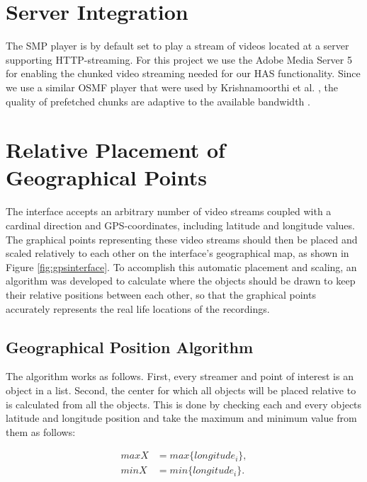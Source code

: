 \section{Server Integration}
\label{sec:serverintegration}

The SMP player is by default set to play a stream of videos located at a server supporting HTTP-streaming. For this project we use the Adobe Media Server 5 for enabling the chunked video streaming needed for our HAS functionality. Since we use a similar OSMF player that were used by Krishnamoorthi et al. \cite{hasmultipath}, the quality of prefetched chunks are adaptive to the available bandwidth \cite{hasmultipath}.

\section{Relative Placement of Geographical Points}
\label{sec:relativeplacement}

The interface accepts an arbitrary number of video streams coupled with a cardinal direction and GPS-coordinates, including latitude and longitude values. The graphical points representing these video streams should then be placed and scaled relatively to each other on the interface's geographical map, as shown in Figure \ref{fig:gpsinterface}. To accomplish this automatic placement and scaling, an algorithm was developed to calculate where the objects should be drawn to keep their relative positions between each other, so that the graphical points accurately represents the real life locations of the recordings.

\subsection{Geographical Position Algorithm}
\label{sec:geoalgorithm}

The algorithm works as follows. First, every streamer and point of interest is an object in a list. Second, the center for which all objects will be placed relative to is calculated from all the objects. This is done by checking each and every objects latitude and longitude position and take the maximum and minimum value from them as follows:

\begin{align}
\label{eq:maxandmin}
maxX &= max\{longitude_i\},  \\
minX &= min\{longitude_i\}. \nonumber
\end{align}
 
